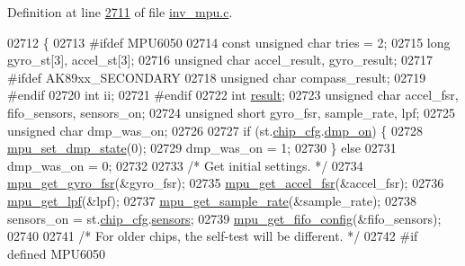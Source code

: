 Definition at line \hyperlink{inv__mpu_8c_source_l02711}{2711} of file \hyperlink{inv__mpu_8c_source}{inv\+\_\+mpu.\+c}.


\begin{DoxyCode}
02712 \{
02713 \textcolor{preprocessor}{#ifdef MPU6050}
02714     \textcolor{keyword}{const} \textcolor{keywordtype}{unsigned} \textcolor{keywordtype}{char} tries = 2;
02715     \textcolor{keywordtype}{long} gyro\_st[3], accel\_st[3];
02716     \textcolor{keywordtype}{unsigned} \textcolor{keywordtype}{char} accel\_result, gyro\_result;
02717 \textcolor{preprocessor}{#ifdef AK89xx\_SECONDARY}
02718     \textcolor{keywordtype}{unsigned} \textcolor{keywordtype}{char} compass\_result;
02719 \textcolor{preprocessor}{#endif}
02720     \textcolor{keywordtype}{int} ii;
02721 \textcolor{preprocessor}{#endif}
02722     \textcolor{keywordtype}{int} \hyperlink{sensor_8h_a4c9d9cb8bb9d2b707a152051408f40e5}{result};
02723     \textcolor{keywordtype}{unsigned} \textcolor{keywordtype}{char} accel\_fsr, fifo\_sensors, sensors\_on;
02724     \textcolor{keywordtype}{unsigned} \textcolor{keywordtype}{short} gyro\_fsr, sample\_rate, lpf;
02725     \textcolor{keywordtype}{unsigned} \textcolor{keywordtype}{char} dmp\_was\_on;
02726 
02727     \textcolor{keywordflow}{if} (st.\hyperlink{structgyro__state__s_ac895217592e2084bd520b0be8e9d20ee}{chip\_cfg}.\hyperlink{structchip__cfg__s_a49fb51079238683b21264827348b5968}{dmp\_on}) \{
02728         \hyperlink{group___d_r_i_v_e_r_s_ga68ed20e6c9663cd7c50469329af8715f}{mpu\_set\_dmp\_state}(0);
02729         dmp\_was\_on = 1;
02730     \} \textcolor{keywordflow}{else}
02731         dmp\_was\_on = 0;
02732 
02733     \textcolor{comment}{/* Get initial settings. */}
02734     \hyperlink{group___d_r_i_v_e_r_s_gaf973c32c73ba912ff512aab948fc31ca}{mpu\_get\_gyro\_fsr}(&gyro\_fsr);
02735     \hyperlink{group___d_r_i_v_e_r_s_gab6087a15ee23db23b6aec41590329a60}{mpu\_get\_accel\_fsr}(&accel\_fsr);
02736     \hyperlink{group___d_r_i_v_e_r_s_gaa95c7e216dcb2d888e9796001ca555f8}{mpu\_get\_lpf}(&lpf);
02737     \hyperlink{group___d_r_i_v_e_r_s_ga2487dd551b701c1c7ed4d6335f02b2f1}{mpu\_get\_sample\_rate}(&sample\_rate);
02738     sensors\_on = st.\hyperlink{structgyro__state__s_ac895217592e2084bd520b0be8e9d20ee}{chip\_cfg}.\hyperlink{structchip__cfg__s_aaa21c01566947e7007476657cb614e3f}{sensors};
02739     \hyperlink{group___d_r_i_v_e_r_s_ga093f11eb10b2639a4b9fe344ea348c54}{mpu\_get\_fifo\_config}(&fifo\_sensors);
02740 
02741     \textcolor{comment}{/* For older chips, the self-test will be different. */}
02742 \textcolor{preprocessor}{#if defined MPU6050}

\end{DoxyCode}
